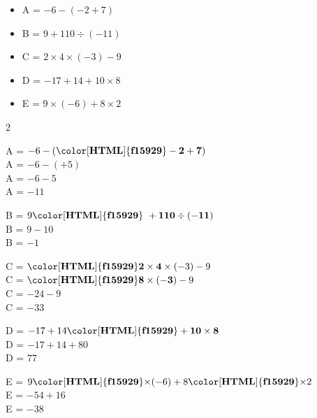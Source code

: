 \begin{exercice*}    
        \begin{itemize}
            \item[] A = $-6-(-2+7)$
            \item[] B = $9+110\div(-11)$
            \item[] C = $2\times4\times(-3)-9$
            \item[] D = $-17+14+10\times8$
            \item[] E = $9\times(-6)+8\times2$
        \end{itemize}
    
\end{exercice*}
\begin{corrige}
    \phantom{rrr}
    \begin{multicols}2
        \begin{list}{}{}
            \item A = $-6-(\mathbf{{\color[HTML]{f15929}-2+7}})$ \\
            A = $-6-(+5)$ \\
            A = $-6-5$ \\
            A = $-11$ 
            \item B = $9\mathbf{{\color[HTML]{f15929}~+110\div(-11)}}$ \\
            B = $9-10$ \\
            B = $-1$ 
            \item C = $\mathbf{{\color[HTML]{f15929}2\times4}}\times(-3)-9$ \\
            C = $\mathbf{{\color[HTML]{f15929}8\times(-3)}}-9$ \\
            C = $-24-9$ \\
            C = $-33$ 
            \item D = $-17+14\mathbf{{\color[HTML]{f15929}+10\times8}}$ \\
            D = $-17+14+80$ \\
            D = $77$ 
            \item E = $9\mathbf{{\color[HTML]{f15929}\times}}(-6)+8\mathbf{{\color[HTML]{f15929}\times}}2$ \\
            E = $-54+16$ \\
            E = $-38$ 
        \end{list}
    \end{multicols}
\end{corrige}
